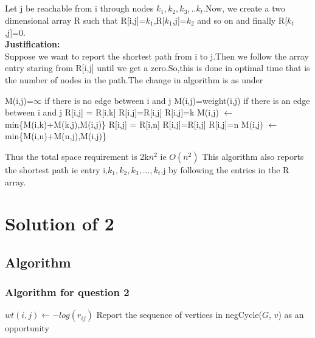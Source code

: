 \documentclass[a4paper,10pt]{article}
\begin{document}
\subsection{}
Let j be reachable from i through nodes $k_1,k_2,k_3,..k_t$.Now, we create a two dimensional array R such that R[i,j]=$k_1$,R[$k_1$,j]=$k_2$ and so on and finally R[$k_t$,j]=0.\\
\textbf{Justification:}\\
Suppose we want to report the shortest path from i to j.Then we follow the array entry staring from R[i,j] until we get a zero.So,this is done in optimal time that is the number of nodes in the path.The change in algorithm is as under\\

\begin{algorithmic}
 \State M(i,j)=$\infty$ if there is no edge between i and j
 \State M(i,j)=weight(i,j) if there is an edge between i and j
      \State R[i,j] = R[i,k]
      \State R[i,j]=R[i,j]
     \Else
      \State R[i,j]=k
     \EndIf
    \EndIf
    \State M(i,j) $\leftarrow$ min\{M(i,k)+M(k,j),M(i,j)\}
   \EndFor
  \EndFor
 \EndFor
     \State R[i,j] = R[i,n]
     \State R[i,j]=R[i,j]
    \Else
     \State R[i,j]=n
    \EndIf
   \EndIf
   \State M(i,j) $\leftarrow$ min\{M(i,n)+M(n,j),M(i,j)\}
  \EndFor
 \EndFor
\EndFunction
\end{algorithmic}

Thus the total space requirement is 2k$n^2$ ie $O(n^2)$
This algorithm also reports the shortest path ie entry i,$k_1,k_2,k_3,...,k_t$,j by following the entries in the R array.
\section{Solution of 2}
\subsection{Algorithm}
\subsubsection{Algorithm for question 2}
 \begin{algorithmic}
  \State $wt(i, j) \leftarrow -log(r_{ij})$
  \EndFor
  \State Report the sequence of vertices in negCycle($G$, $v$) as an opportunity
  \EndIf
  \EndFor
 \end{algorithmic}
\end{document}
